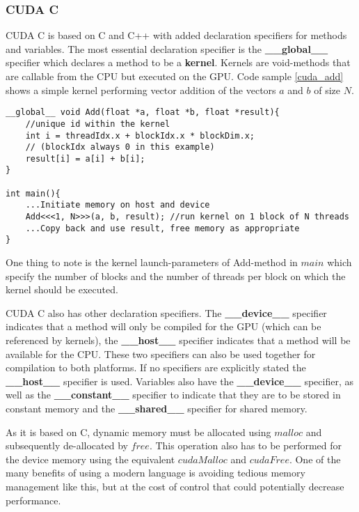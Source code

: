 \subsubsection{CUDA C}
CUDA C is based on C and C++ with added declaration specifiers for methods and variables. 
The most essential declaration specifier is the \textbf{\_\_global\_\_} specifier which declares a method to be a \textbf{kernel}. 
Kernels are void-methods that are callable from the CPU but executed on the GPU. 
Code sample \ref{cuda_add} shows a simple kernel performing vector addition of the vectors $a$ and $b$ of size $N$.
\begin{lstlisting}[language=cudac, caption=CUDA C addition kernel, label=cuda_add]
__global__ void Add(float *a, float *b, float *result){
	//unique id within the kernel
	int i = threadIdx.x + blockIdx.x * blockDim.x;
	// (blockIdx always 0 in this example)
	result[i] = a[i] + b[i];
}

int main(){
	...Initiate memory on host and device
	Add<<<1, N>>>(a, b, result); //run kernel on 1 block of N threads
	...Copy back and use result, free memory as appropriate
}
\end{lstlisting}

One thing to note is the kernel launch-parameters of Add-method in $main$ which specify the number of blocks and the number of threads per block on which the kernel should be executed. 

CUDA C also has other declaration specifiers. 
The \textbf{\_\_device\_\_} specifier indicates that a method will only be compiled for the GPU (which can be referenced by kernels), the \textbf{\_\_host\_\_} specifier indicates that a method will be available for the CPU.
These two specifiers can also be used together for compilation to both platforms.
If no specifiers are explicitly stated the \textbf{\_\_host\_\_} specifier is used.
Variables also have the \textbf{\_\_device\_\_} specifier, as well as the \textbf{\_\_constant\_\_} specifier to indicate that they are to be stored in constant memory and the \textbf{\_\_shared\_\_} specifier for shared memory.

As it is based on C, dynamic memory must be allocated using $malloc$ and subsequently de-allocated by $free$.
This operation also has to be performed for the device memory using the equivalent $cudaMalloc$ and $cudaFree$.
One of the many benefits of using a modern language is avoiding tedious memory management like this, but at the cost of control that could potentially decrease performance.

